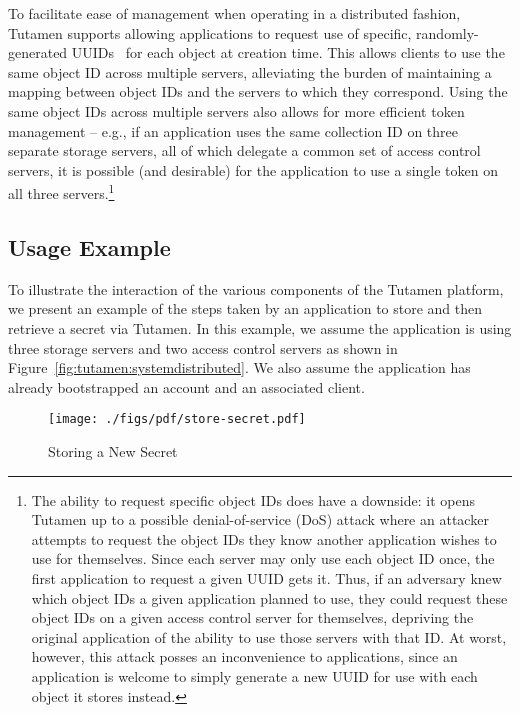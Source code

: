 To facilitate ease of management when operating in a distributed
fashion, Tutamen supports allowing applications to request use of
specific, randomly-generated UUIDs~\cite{leach2005} for each object at
creation time. This allows clients to use the same object ID across
multiple servers, alleviating the burden of maintaining a mapping
between object IDs and the servers to which they correspond. Using the
same object IDs across multiple servers also allows for more efficient
token management -- e.g., if an application uses the same collection
ID on three separate storage servers, all of which delegate a common
set of access control servers, it is possible (and desirable) for the
application to use a single token on all three servers.\footnote{The
  ability to request specific object IDs does have a downside: it
  opens Tutamen up to a possible denial-of-service (DoS) attack where
  an attacker attempts to request the object IDs they know another
  application wishes to use for themselves. Since each server may only
  use each object ID once, the first application to request a given
  UUID gets it. Thus, if an adversary knew which object IDs a given
  application planned to use, they could request these object IDs on a
  given access control server for themselves, depriving the original
  application of the ability to use those servers with that ID. At
  worst, however, this attack posses an inconvenience to applications,
  since an application is welcome to simply generate a new UUID for
  use with each object it stores instead.}

\subsection{Usage Example}

To illustrate the interaction of the various components of the Tutamen
platform, we present an example of the steps taken by an application
to store and then retrieve a secret via Tutamen. In this example, we
assume the application is using three storage servers and two access
control servers as shown in
Figure~\ref{fig:tutamen:systemdistributed}. We also assume the
application has already bootstrapped an account and an associated
client.

\begin{figure}[th]
  \centering
  \texttt{[image: ./figs/pdf/store-secret.pdf]}
  \caption{Storing a New Secret}
  \label{fig:tutamen:storesecret}
\end{figure}

